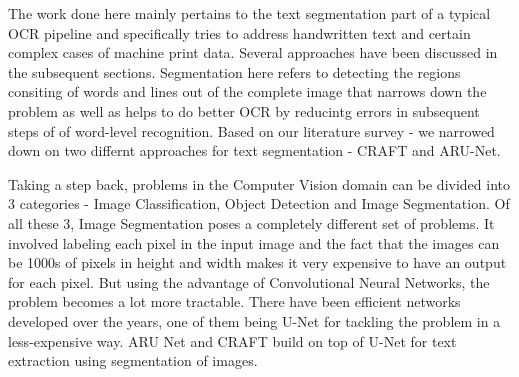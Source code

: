 The work done here mainly pertains to the text segmentation part of a typical OCR pipeline and specifically tries to address handwritten text and certain complex cases of machine print data. Several approaches have been discussed in the subsequent sections. Segmentation here refers to detecting the regions consiting of words and lines out of the complete image that narrows down the problem as well as helps to do better OCR by reducintg errors in subsequent steps of of word-level recognition. Based on our literature survey - we narrowed down on two differnt approaches for text segmentation - CRAFT and ARU-Net.

Taking a step back, problems in the Computer Vision domain can be divided into 3 categories - Image Classification, Object Detection and Image Segmentation. Of all these 3, Image Segmentation poses a completely different set of problems. It involved labeling each pixel in the input image and the fact that the images can be 1000s of pixels in height and width makes it very expensive to have an output for each pixel. But using the advantage of Convolutional Neural Networks, the problem becomes a lot more tractable. There have been efficient networks developed over the years, one of them being U-Net for tackling the problem in a less-expensive way. ARU Net and CRAFT build on top of U-Net for text extraction using segmentation of images.

